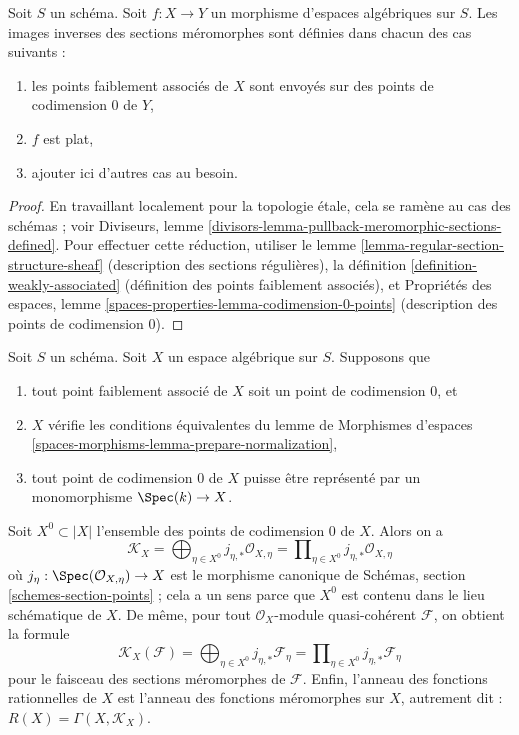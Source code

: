 \begin{lemma}
\label{lemma-pullback-meromorphic-sections-defined}
Soit $S$ un schéma. Soit $f : X \to Y$ un morphisme d'espaces algébriques
sur $S$. Les images inverses des sections méromorphes sont définies
dans chacun des cas suivants :
\begin{enumerate}
\item les points faiblement associés de $X$ sont envoyés
sur des points de codimension $0$ de $Y$,
\item $f$ est plat,
\item ajouter ici d'autres cas au besoin.
\end{enumerate}
\end{lemma}

\begin{proof}
En travaillant localement pour la topologie \'etale, cela se ramène au cas des schémas ; voir
Diviseurs, lemme \ref{divisors-lemma-pullback-meromorphic-sections-defined}.
Pour effectuer cette réduction, utiliser le lemme \ref{lemma-regular-section-structure-sheaf}
(description des sections régulières),
la définition \ref{definition-weakly-associated} (définition
des points faiblement associés), et
Propriétés des espaces, lemme \ref{spaces-properties-lemma-codimension-0-points}
(description des points de codimension $0$).
\end{proof}

\begin{lemma}
\label{lemma-compute-meromorphic}
Soit $S$ un schéma. Soit $X$ un espace algébrique sur $S$. Supposons que
\begin{enumerate}
\item[(a)] tout point faiblement associé de $X$
soit un point de codimension $0$, et
\item[(b)] $X$ vérifie les conditions équivalentes
du lemme de Morphismes d'espaces
\ref{spaces-morphisms-lemma-prepare-normalization},
\item[(c)] tout point de codimension $0$ de $X$ puisse être représenté
par un monomorphisme $\Spec(k) \to X$.
\end{enumerate}
Soit $X^0 \subset |X|$ l'ensemble des points de codimension $0$ de $X$.
Alors on a
$$
\mathcal{K}_X =
\bigoplus\nolimits_{\eta \in X^0} j_{\eta, *}\mathcal{O}_{X, \eta} =
\prod\nolimits_{\eta \in X^0} j_{\eta, *}\mathcal{O}_{X, \eta}
$$
où $j_\eta : \Spec(\mathcal{O}_{X, \eta}) \to X$ est le morphisme canonique
de Schémas, section \ref{schemes-section-points} ; cela a un sens parce que
$X^0$ est contenu dans le lieu schématique de $X$. De même,
pour tout $\mathcal{O}_X$-module quasi-cohérent $\mathcal{F}$,
on obtient la formule
$$
\mathcal{K}_X(\mathcal{F}) =
\bigoplus\nolimits_{\eta \in X^0} j_{\eta, *}\mathcal{F}_\eta =
\prod\nolimits_{\eta \in X^0} j_{\eta, *}\mathcal{F}_\eta
$$
pour le faisceau des sections méromorphes de $\mathcal{F}$.
Enfin, l'anneau des fonctions rationnelles de $X$ est l'anneau des fonctions
méromorphes sur $X$, autrement dit : $R(X) = \Gamma(X, \mathcal{K}_X)$.
\end{lemma}

